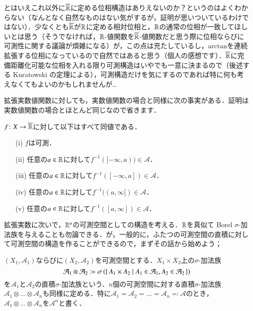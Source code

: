 \begin{que}[**]
とはいえこれ以外に$\overline{\mathbb{R}}$に定める位相構造はありえないのか？というのはよくわからない（なんとなく自然なものはない気がするが，証明が思いついているわけではない）．少なくとも$\overline{\mathbb{R}}$が$\mathbb{R}$に定める相対位相と，$\mathbb{R}$の通常の位相が一致してほしいとは思う（そうでなければ，$\mathbb{R}$-値関数を$\overline{\mathbb{R}}$-値関数だと思う際に位相ならびに可測性に関する議論が煩雑になる）が，この点は充たしているし，$\mathrm{arctan}$を連続拡張する位相になっているので自然ではあると思う（個人の感想です）．$\overline{\mathbb{R}}$に完備距離化可能な位相を入れる限り可測構造はいやでも一意に決まるので（後述する Kuratowski の定理による），可測構造だけを気にするのであれば特に何も考えなくてもよいのかもしれませんが…
\end{que}

拡張実数値関数に対しても，実数値関数の場合と同様に次の事実がある．証明は実数値関数の場合とほとんど同じなので省きます．

\begin{que}
$f \colon X \to \overline{\mathbb{R}}$に対して以下はすべて同値である．
\begin{enumerate}
\item[(i)] $f$は可測．
\item[(ii)] 任意の$a \in \mathbb{R}$に対して$f^{-1}([-\infty,a)) \in \mathcal{A}$．
\item[(iii)] 任意の$a \in \mathbb{R}$に対して$f^{-1}([-\infty,a]) \in \mathcal{A}$．
\item[(iv)] 任意の$a \in \mathbb{R}$に対して$f^{-1}((a,\infty]) \in \mathcal{A}$．
\item[(v)] 任意の$a \in \mathbb{R}$に対して$f^{-1}([a,\infty]) \in \mathcal{A}$．
\end{enumerate}
\end{que}

拡張実数に次いで，$\mathbb{R}^n$の可測空間としての構造を考える．$\mathbb{R}$を真似て Borel $\sigma$-加法族を与えることも勿論できる．が，一般的に，ふたつの可測空間の直積に対して可測空間の構造を作ることができるので，まずその話から始めよう；

\begin{defi}
$(X_1, \mathcal{A}_1)$ならびに$(X_2, \mathcal{A}_2)$を可測空間とする．$X_1 \times X_2$上の$\sigma$-加法族
\begin{equation}
\mathcal{A}_1 \otimes \mathcal{A}_2 \coloneqq \sigma\left( \set{A_1 \times A_2 | A_1 \in \mathcal{A}_1, A_2 \in \mathcal{A}_2} \right)
\end{equation}を$\mathcal{A}_1$と$\mathcal{A}_2$の直積$\sigma$-加法族という．$n$個の可測空間に対する直積$\sigma$-加法族$\mathcal{A}_1 \otimes \dots \otimes \mathcal{A}_n$も同様に定める．特に$\mathcal{A}_1 = \mathcal{A}_2 = \dots = \mathcal{A}_n \eqqcolon \mathcal{A}$のとき，$\mathcal{A}_1 \otimes \dots \otimes \mathcal{A}_n$を$\mathcal{A}^{n}$と書く．
\end{defi}


